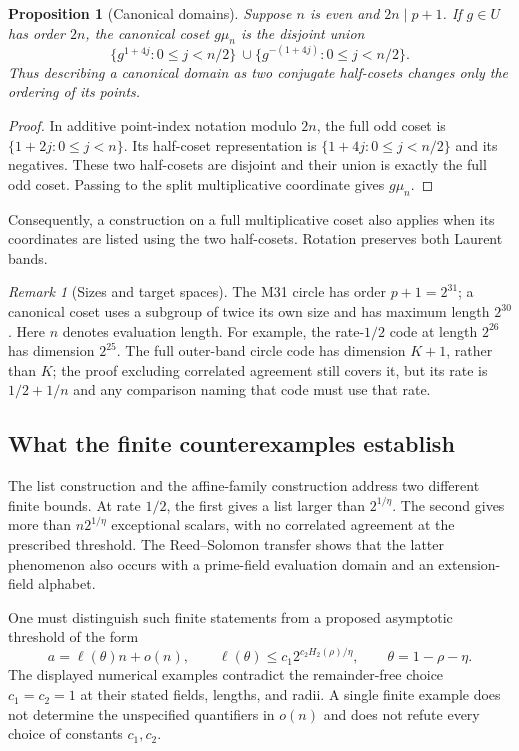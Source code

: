 \documentclass[11pt,letterpaper]{article}
\newtheorem{proposition}[theorem]{Proposition}
\theoremstyle{definition}
\theoremstyle{remark}
\newtheorem{remark}[theorem]{Remark}
\begin{document}
\begin{proposition}[Canonical domains]
\label{prop:ct-canonical}
Suppose $n$ is even and $2n\mid p+1$. If $g\in U$ has order $2n$,
the canonical coset $g\mu_n$ is the disjoint union
\[
 \{g^{1+4j}:0\le j<n/2\}\ \cup
 \{g^{-(1+4j)}:0\le j<n/2\}.
\]
Thus describing a canonical domain as two conjugate half-cosets changes
only the ordering of its points.
\end{proposition}
\begin{proof}
In additive point-index notation modulo $2n$, the full odd coset is
$\{1+2j:0\le j<n\}$. Its half-coset representation is
$\{1+4j:0\le j<n/2\}$ and its negatives. These two half-cosets are
disjoint and their union is exactly the full odd coset. Passing to the
split multiplicative coordinate gives $g\mu_n$.
\end{proof}

Consequently, a construction on a full multiplicative coset also applies
when its coordinates are listed using the two half-cosets. Rotation
preserves both Laurent bands.

\begin{remark}[Sizes and target spaces]
The M31 circle has order $p+1=2^{31}$; a canonical coset uses a subgroup
of twice its own size and has maximum length $2^{30}$. Here $n$ denotes evaluation length. For example, the rate-$1/2$
code at length $2^{26}$ has dimension $2^{25}$. The full outer-band circle code has
dimension $K+1$, rather than $K$; the proof excluding correlated agreement still covers it, but its
rate is $1/2+1/n$ and any comparison naming that code must use that rate.
\end{remark}

\subsection{What the finite counterexamples establish}
\label{sec:ct-scope}

The list construction and the affine-family construction address two
different finite bounds. At rate $1/2$, the first gives a list larger than
$2^{1/\eta}$. The second gives more than $n2^{1/\eta}$ exceptional
scalars, with no correlated agreement at the prescribed threshold. The
Reed--Solomon transfer shows that the latter phenomenon also occurs with
a prime-field evaluation domain and an extension-field alphabet.

One must distinguish such finite statements from a proposed asymptotic
threshold of the form
\[
 a=\ell(\theta)n+o(n),\qquad
 \ell(\theta)\le c_1 2^{c_2 H_2(\rho)/\eta},\qquad
 \theta=1-\rho-\eta.
\]
The displayed numerical examples contradict the remainder-free choice
$c_1=c_2=1$ at their stated fields, lengths, and radii. A single finite
example does not determine the unspecified quantifiers in $o(n)$ and
does not refute every choice of constants $c_1,c_2$.
\end{document}
